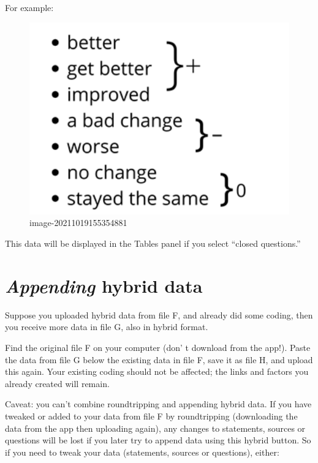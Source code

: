 \documentclass[
]{book}
\begin{document}
For example:

\begin{figure}
\centering
\includegraphics[width=6.77083in,height=\textheight]{_assets/image-20211019155354881.png}
\caption{image-20211019155354881}
\end{figure}

This data will be displayed in the Tables panel if you select ``closed questions.''

\hypertarget{appending-hybrid-data}{%
\section{\texorpdfstring{\emph{Appending} hybrid data}{Appending hybrid data}}\label{appending-hybrid-data}}

Suppose you uploaded hybrid data from file F, and already did some coding, then you receive more data in file G, also in hybrid format.

Find the original file F on your computer (don' t download from the app!). Paste the data from file G below the existing data in file F, save it as file H, and upload this again. Your existing coding should not be affected; the links and factors you already created will remain.

Caveat: you can't combine roundtripping and appending hybrid data. If you have tweaked or added to your data from file F by roundtripping (downloading the data from the app then uploading again), any changes to statements, sources or questions will be lost if you later try to append data using this hybrid button. So if you need to tweak your data (statements, sources or questions), either:
\end{document}
